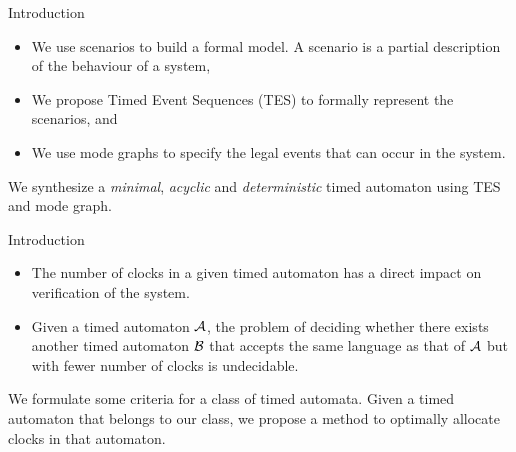 \documentclass[10pt]{beamer}
\theoremstyle{plain}
\theoremstyle{definition}
\begin{document}
\begin{frame}{Introduction}
	\begin{itemize}
		\item We use scenarios to build a formal model. A scenario is a partial description of the behaviour of a system,
		\item We propose Timed Event Sequences (TES) to formally represent the scenarios, and
		\item We use mode graphs to specify the legal events that can occur in the system.
	\end{itemize}
	\alert{We synthesize a \emph{minimal}, \emph{acyclic} and \emph{deterministic} timed automaton using TES and mode graph.}
\end{frame}


\begin{frame}{Introduction}
	\begin{itemize}
		\item The number of clocks in a given timed automaton has a direct impact on verification of the system.
		\item Given a timed automaton $\cal A$, the problem of deciding whether there exists another timed automaton $\cal B$ that accepts the same language as that of $\cal A$ but with fewer number of clocks is undecidable.
		
	\end{itemize}
	\vspace{0.5cm}
	
	\alert{	We formulate some criteria for a class of timed automata. Given a timed automaton that belongs to our class, we propose a method to optimally allocate clocks in that automaton.} %
\end{frame}
\end{document}
